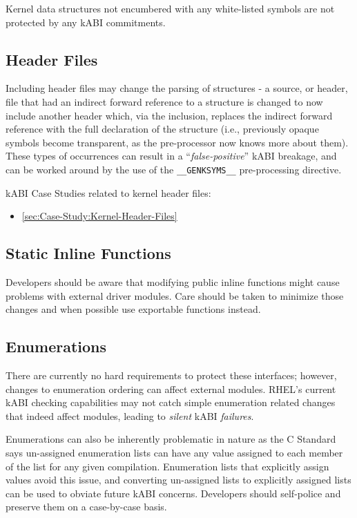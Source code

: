 \documentclass[10pt,oneside,english]{book}
\newcommand*{\fullref}[1]{\hyperref[{#1}]{\autoref*{#1} \nameref*{#1}}}
\begin{document}
Kernel data structures not encumbered with any white-listed symbols
are not protected by any kABI commitments.

\subsection{Header Files}

Including header files may change the parsing of structures - a source,
or header, file that had an indirect forward reference to a structure
is changed to now include another header which, via the inclusion,
replaces the indirect forward reference with the full declaration
of the structure (i.e., previously opaque symbols become transparent,
as the pre-processor now knows more about them). These types of occurrences
can result in a ``\emph{false-positive}'' kABI breakage, and can
be worked around by the use of the \texttt{\_\_GENKSYMS\_\_} pre-processing
directive.

kABI Case Studies related to kernel header files:
\begin{itemize}
\item \fullref{sec:Case-Study:Kernel-Header-Files}
\end{itemize}

\subsection{Static Inline Functions}

Developers should be aware that modifying public inline functions
might cause problems with external driver modules. Care should be
taken to minimize those changes and when possible use exportable functions
instead.

\subsection{Enumerations}

There are currently no hard requirements to protect these interfaces;
however, changes to enumeration ordering can affect external modules.
RHEL's current kABI checking capabilities may not catch simple enumeration
related changes that indeed affect modules, leading to \emph{silent
}kABI\emph{ failures}.

Enumerations can also be inherently problematic in nature as the C
Standard says un-assigned enumeration lists can have any value assigned
to each member of the list for any given compilation. Enumeration
lists that explicitly assign values avoid this issue, and converting
un-assigned lists to explicitly assigned lists can be used to obviate
future kABI concerns. Developers should self-police and preserve them
on a case-by-case basis.
\end{document}

